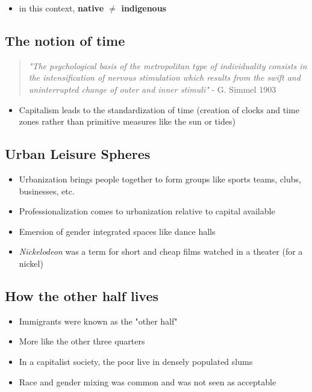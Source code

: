 \documentclass[12pt]{book}
\begin{document}
\begin{itemize}
    \item in this context, \textbf{native $\neq$ indigenous}
\end{itemize}

\subsection{The notion of time}

\begin{quote}
    \textit{"The psychological basis of the metropolitan type of individuality consists in the intensification of nervous stimulation which results from the swift and uninterrupted change of outer and inner stimuli"} - G. Simmel 1903
\end{quote}

\begin{itemize}
    \item Capitalism leads to the standardization of time (creation of clocks and time zones rather than primitive measures like the sun or tides)
\end{itemize}

\subsection{Urban Leisure Spheres}
\begin{itemize}
    \item Urbanization brings people together to form groups like sports teams, clubs, businesses, etc.
    \item Professionalization comes to urbanization relative to capital available 
    \item Emersion of gender integrated spaces like dance halls
    \item \textit{Nickelodeon} was a term for short and cheap films watched in a theater (for a nickel)
\end{itemize}

\subsection{How the other half lives}

\begin{itemize}
    \item Immigrants were known as the "other half"
    \item More like the other three quarters
    \item In a capitalist society, the poor live in densely populated slums
    \item Race and gender mixing was common and was not seen as acceptable
\end{itemize}
\end{document}
